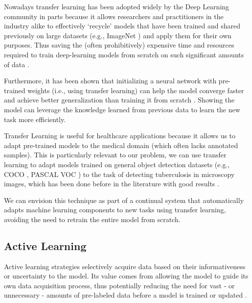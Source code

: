 \documentclass[../main.tex]{subfiles}
\begin{document}
     Nowadays transfer learning has been adopted widely by the Deep Learning community in parts because it allows researchers and practitioners in the industry alike to effectively `recycle' models that have been trained and shared previously on large datasets (e.g., ImageNet \cite{dengImageNetLargescaleHierarchical2009}) and apply them for their own purposes. Thus saving the (often prohibitively) expensive time and resources required to train deep-learning models from scratch on such significant amounts of data  \cite{yosinskiHowTransferableAre2014}.

     Furthermore, it has been shown that initializing a neural network with pre-trained weights (i.e., using transfer learning) can help the model converge faster and achieve better generalization than training it from scratch \cite{yosinskiHowTransferableAre2014}. Showing the model can leverage the knowledge learned from previous data to learn the new task more efficiently.

     Transfer Learning is useful for healthcare applications because it allows us to adapt pre-trained models to the medical domain (which often lacks annotated samples). This is particularly relevant to our problem, we can use transfer learning to adapt models trained on general object detection datasets (e.g., COCO \cite{linMicrosoftCOCOCommon2015}, PASCAL VOC \cite{everinghamPascalVisualObject2010}) to the task of detecting tuberculosis in microscopy images, which has been done before in the literature with good results \cite{visuna_novel_2023}.

     We can envision this technique as part of a continual system that automatically adapts machine learning components to new tasks using transfer learning, avoiding the need to retrain the entire model from scratch.

	
    \subsection{Active Learning} \label{sec:active_learning} 
 
     Active learning strategies selectively acquire data based on their informativeness or uncertainty to the model. Its value comes from allowing the model to guide its own data acquisition process, thus potentially reducing the need for vast - or unnecessary - amounts of pre-labeled data before a model is trained or updated \cite{huyen_designing_2022, chen_study_2015, figueroa_predicting_2012}. 
     
\end{document}
